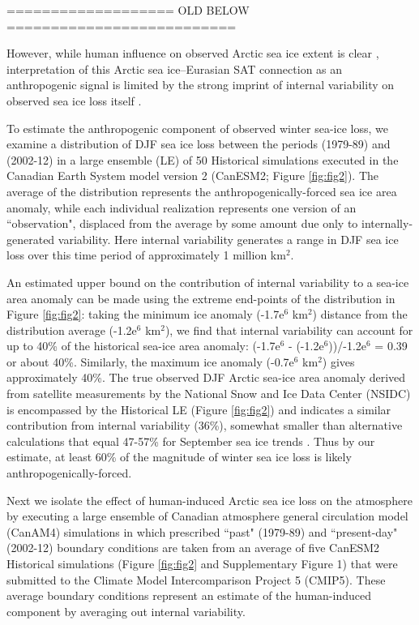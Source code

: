 \documentclass{nature}
\begin{document}
 
 
 
 =================== OLD BELOW ==========================
 
 However, while human influence on observed Arctic sea ice extent is clear \cite{min08}, interpretation of this Arctic sea ice--Eurasian SAT connection as an anthropogenic signal is limited by the strong imprint of internal variability on observed sea ice loss itself \cite{swart15}. 

To estimate the anthropogenic component of observed winter sea-ice loss, we examine a distribution of DJF sea ice loss between the periods (1979-89) and (2002-12) in a large ensemble (LE) of 50 Historical simulations executed in the Canadian Earth System model version 2 (CanESM2; Figure \ref{fig:fig2}). The average of the distribution represents the anthropogenically-forced sea ice area anomaly, while each individual realization represents one version of an ``observation", displaced from the average by some amount due only to internally-generated variability. Here internal variability generates a range in DJF sea ice loss over this time period of approximately 1 million km$^2$. 

An estimated upper bound on the contribution of internal variability to a sea-ice area anomaly can be made using the extreme end-points of the distribution in Figure \ref{fig:fig2}: taking the minimum ice anomaly (-1.7e$^6$ km$^2$) distance from the distribution average (-1.2e$^6$ km$^2$), we find that internal variability can account for up to 40\% of the historical sea-ice area anomaly: (-1.7e$^6$ - (-1.2e$^6$))/-1.2e$^6$ = 0.39 or about 40\%. Similarly, the maximum ice anomaly (-0.7e$^6$ km$^2$) gives approximately 40\%. The true observed DJF Arctic sea-ice area anomaly derived from satellite measurements by the National Snow and Ice Data Center (NSIDC) is encompassed by the Historical LE (Figure \ref{fig:fig2}) and indicates a similar contribution from internal variability (36\%), somewhat smaller than alternative calculations that equal 47-57\% for September sea ice trends \cite{kay11,stroeve07}. Thus by our estimate, at least 60\% of the magnitude of winter sea ice loss is likely anthropogenically-forced. 

Next we isolate the effect of human-induced Arctic sea ice loss on the atmosphere by executing a large ensemble of Canadian atmosphere general circulation model (CanAM4) simulations in which prescribed ``past" (1979-89) and ``present-day" (2002-12) boundary conditions are taken from an average of five CanESM2 Historical simulations (Figure \ref{fig:fig2} and Supplementary Figure 1) that were submitted to the Climate Model Intercomparison Project 5 (CMIP5). These average boundary conditions represent an estimate of the human-induced component by averaging out internal variability. 
\end{document}

